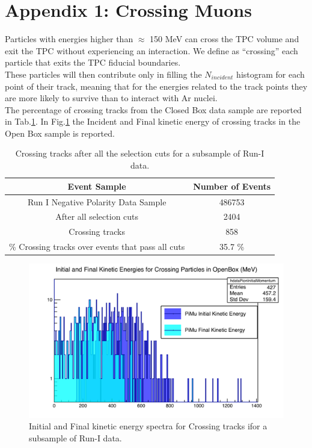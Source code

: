 \section{Appendix 1: Crossing Muons} \label{appendix:CrossingMuon}
Particles with energies higher than $\approx$ 150 MeV can cross the TPC volume and exit the TPC without experiencing an interaction. We define as “crossing” each particle that exits the TPC fiducial boundaries.\\
These particles will then contribute only in filling the $N_{incident}$ histogram for each point of their track, meaning that for the energies related to the track points they are more likely to survive than to interact with Ar nuclei.\\

The percentage of crossing tracks from the Closed Box data sample are reported in Tab.\ref{tabellaCrossing}. In Fig.\ref{CrossingOBKinEn} the Incident and Final kinetic energy of crossing tracks in the Open Box sample is reported.
\begin{table}[ht!]
\centering
\begin{tabular}{|c|c|}
\hline
\textbf{Event Sample} & \textbf{Number of Events} \\ 
\hline \hline
Run I Negative Polarity Data Sample                                                                          & 486753           \\
\hline
After all selection cuts                                                                      & 2404             \\
\hline
Crossing tracks                                                                               & 858              \\
\hline
\% Crossing tracks over events that pass all cuts & 35.7 \%\\          
\hline
\end{tabular}
\caption{Crossing tracks after all the selection cuts for a subsample of Run-I data.} 
\label{tabellaCrossing}
\end{table}

\begin{figure}[h!]
\centering
\includegraphics[scale=0.45]{./images/OBparticles_crossingKinEn.png}
\caption{Initial and Final kinetic energy spectra for Crossing tracks ifor a subsample of Run-I data.}
\label{CrossingOBKinEn}
\end{figure}


